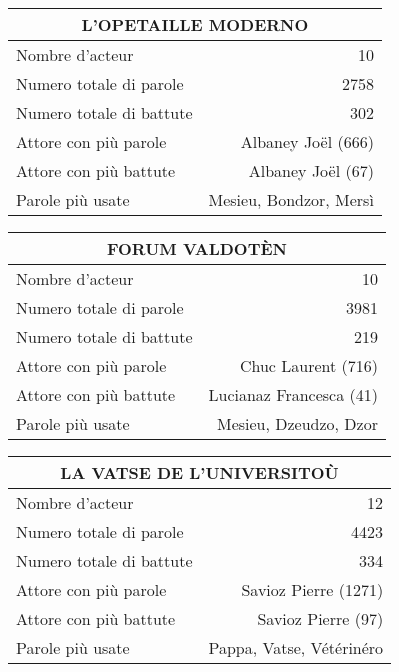     \begin{table}[]
    \centering
    \begin{tabular}{lr}\toprule\multicolumn{2}{c}{L’OPETAILLE MODERNO} \\\midrule
\multicolumn{1}{l}{Nombre d'acteur}&10\\
\multicolumn{1}{l}{Numero totale di parole}&2758\\
\multicolumn{1}{l}{Numero totale di battute}&302\\
\multicolumn{1}{l}{Attore con più parole}&Albaney Joël (666)\\
\multicolumn{1}{l}{Attore con più battute}&Albaney Joël (67)\\
\multicolumn{1}{l}{Parole più usate}&Mesieu, Bondzor, Mersì\\
    \bottomrule
    \end{tabular}%
    \end{table}
    \begin{table}[]
    \centering
    \begin{tabular}{lr}\toprule\multicolumn{2}{c}{FORUM VALDOTÈN} \\\midrule
\multicolumn{1}{l}{Nombre d'acteur}&10\\
\multicolumn{1}{l}{Numero totale di parole}&3981\\
\multicolumn{1}{l}{Numero totale di battute}&219\\
\multicolumn{1}{l}{Attore con più parole}&Chuc Laurent (716)\\
\multicolumn{1}{l}{Attore con più battute}&Lucianaz Francesca (41)\\
\multicolumn{1}{l}{Parole più usate}&Mesieu, Dzeudzo, Dzor\\
    \bottomrule
    \end{tabular}%
    \end{table}
    \begin{table}[]
    \centering
    \begin{tabular}{lr}\toprule\multicolumn{2}{c}{LA VATSE DE L’UNIVERSITOÙ} \\\midrule
\multicolumn{1}{l}{Nombre d'acteur}&12\\
\multicolumn{1}{l}{Numero totale di parole}&4423\\
\multicolumn{1}{l}{Numero totale di battute}&334\\
\multicolumn{1}{l}{Attore con più parole}&Savioz Pierre (1271)\\
\multicolumn{1}{l}{Attore con più battute}&Savioz Pierre (97)\\
\multicolumn{1}{l}{Parole più usate}&Pappa, Vatse, Vétérinéro\\
    \bottomrule
    \end{tabular}%
    \end{table}
